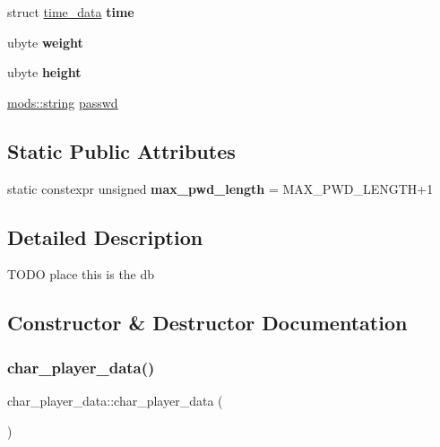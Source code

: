 \begin{DoxyCompactItemize}
struct \hyperlink{structtime__data}{time\+\_\+data} {\bfseries time}
\item 
\mbox{\label{structchar__player__data_a66064b86d5399c8210fffc8e737ab7c7}} 
ubyte {\bfseries weight}
\item 
\mbox{\label{structchar__player__data_acfaeb458f654439d38c9cd10a3b1db64}} 
ubyte {\bfseries height}
\item 
\hyperlink{structmods_1_1string}{mods\+::string} \hyperlink{structchar__player__data_a12af4ba80fd0d983e080dda62ac8522c}{passwd}
\end{DoxyCompactItemize}
\subsection*{Static Public Attributes}
\begin{DoxyCompactItemize}
\item 
\mbox{\label{structchar__player__data_a9702ca03f2f910ce0dd1619488a08d5c}} 
static constexpr unsigned {\bfseries max\+\_\+pwd\+\_\+length} = M\+A\+X\+\_\+\+P\+W\+D\+\_\+\+L\+E\+N\+G\+TH+1
\end{DoxyCompactItemize}


\subsection{Detailed Description}
T\+O\+DO place this is the db 

\subsection{Constructor \& Destructor Documentation}
\mbox{\label{structchar__player__data_af63d02e377ae646aaf4f7eaa13de601c}} 
\subsubsection{\texorpdfstring{char\+\_\+player\+\_\+data()}{char\_player\_data()}}
{\footnotesize\ttfamily char\+\_\+player\+\_\+data\+::char\+\_\+player\+\_\+data (\begin{DoxyParamCaption}{ }\end{DoxyParamCaption})}

